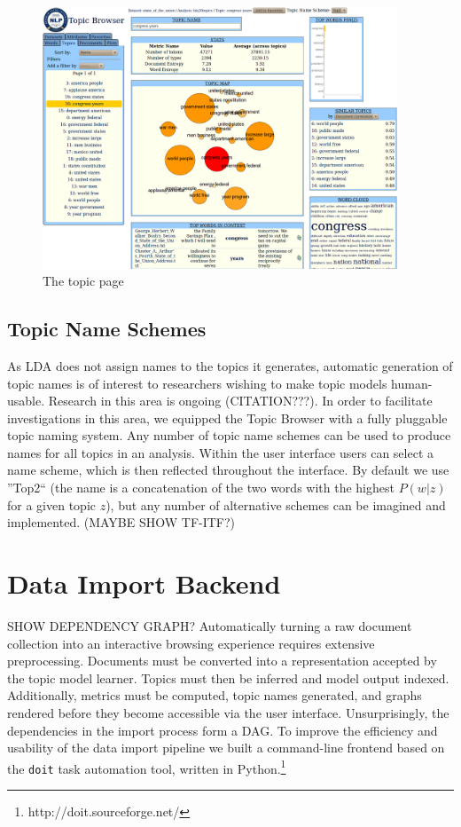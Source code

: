 \begin{figure}[p]
 \centering
 \includegraphics[width=400px,keepaspectratio=true]{./topic_page_huge_cropped.png}
 \caption{The topic page}
 \label{fig:topic_page}
\end{figure}

\subsection{Topic Name Schemes}
As LDA does not assign names to the topics it generates, automatic generation of
topic names is of interest to researchers wishing to make topic models
human-usable. Research in this area is ongoing (CITATION???). In order to
facilitate investigations in this area, we equipped the Topic Browser with a
fully pluggable topic naming system. Any number of topic name schemes can be
used to produce names for all topics in an analysis. Within the user interface
users can select a name scheme, which is then reflected throughout the
interface. By default we use ''Top2`` (the name is a concatenation of the two
words with the highest $P(w|z)$ for a given topic $z$), but any number of
alternative schemes can be imagined and implemented. (MAYBE SHOW TF-ITF?)

\section{Data Import Backend}
SHOW DEPENDENCY GRAPH?
Automatically turning a raw document collection into an interactive browsing
experience requires extensive preprocessing. Documents must be converted into a
representation accepted by the topic model learner. Topics must then be inferred
and model output indexed. Additionally, metrics must be computed, topic names
generated, and graphs rendered before they become accessible via the user
interface. Unsurprisingly, the dependencies in the import process form a DAG. To
improve the efficiency and usability of the data import pipeline we built a
command-line frontend based on the \verb/doit/ task automation tool, written in
Python.\footnote{http://doit.sourceforge.net/}


